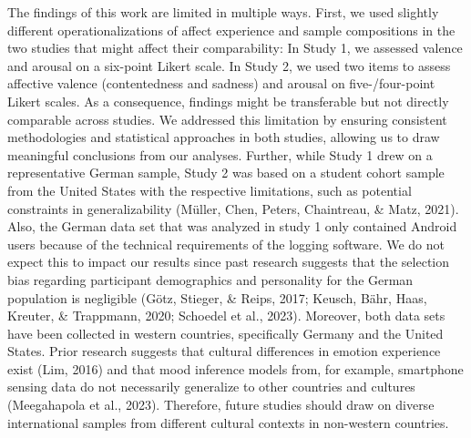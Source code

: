 \documentclass[
  english,
  man,floatsintext]{apa6}
\begin{document}
The findings of this work are limited in multiple ways. First, we used slightly different operationalizations of affect experience and sample compositions in the two studies that might affect their comparability: In Study 1, we assessed valence and arousal on a six-point Likert scale. In Study 2, we used two items to assess affective valence (contentedness and sadness) and arousal on five-/four-point Likert scales. As a consequence, findings might be transferable but not directly comparable across studies. We addressed this limitation by ensuring consistent methodologies and statistical approaches in both studies, allowing us to draw meaningful conclusions from our analyses. Further, while Study 1 drew on a representative German sample, Study 2 was based on a student cohort sample from the United States with the respective limitations, such as potential constraints in generalizability (Müller, Chen, Peters, Chaintreau, \& Matz, 2021). Also, the German data set that was analyzed in study 1 only contained Android users because of the technical requirements of the logging software. We do not expect this to impact our results since past research suggests that the selection bias regarding participant demographics and personality for the German population is negligible (Götz, Stieger, \& Reips, 2017; Keusch, Bähr, Haas, Kreuter, \& Trappmann, 2020; Schoedel et al., 2023). Moreover, both data sets have been collected in western countries, specifically Germany and the United States. Prior research suggests that cultural differences in emotion experience exist (Lim, 2016) and that mood inference models from, for example, smartphone sensing data do not necessarily generalize to other countries and cultures (Meegahapola et al., 2023). Therefore, future studies should draw on diverse international samples from different cultural contexts in non-western countries.
\end{document}
